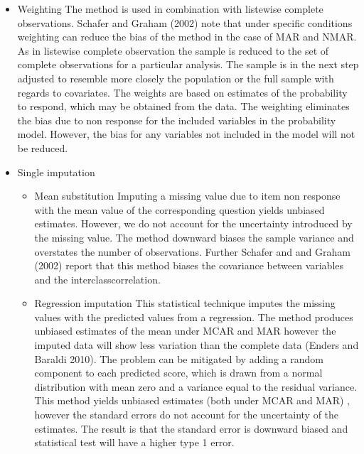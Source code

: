 \begin{itemize}
 \item Weighting
The method is used in combination with listewise complete observations. Schafer and Graham (2002) note that under specific conditions weighting can reduce the bias of the method in the case of MAR and NMAR. As in listewise complete observation the sample is reduced to the set of complete observations for a particular analysis. The sample is in the next step adjusted to resemble more closely the population or the full sample with regards to covariates. The weights are based on estimates of the probability to respond, which may be obtained from the data. The weighting eliminates the bias due to non response for the included variables in the probability model. However, the bias for any variables not included in the model will not be reduced.
\end{itemize}
 \begin{itemize} 
\item Single imputation
\begin{itemize}
\item Mean substitution
Imputing a missing value due to item non response with the mean value of the corresponding question yields unbiased estimates. However, we do not account for the uncertainty introduced by the missing value. The method downward biases the sample variance and  overstates the number of observations. Further Schafer and and Graham (2002) report that this method biases the covariance between variables and the interclasscorrelation. 
\item  Regression imputation
This statistical technique imputes the missing values with the predicted values from a regression. The method produces unbiased estimates of the mean under MCAR and MAR however the imputed data will show less variation than the complete data (Enders and Baraldi 2010). The problem can be mitigated by adding a random component to each predicted score, which is drawn from a normal distribution with mean zero and a variance equal to the residual variance. This method yields unbiased estimates (both under MCAR and MAR) , however the standard errors do not account for the uncertainty of the estimates. The result is that the standard error is downward biased and statistical test will have a higher type 1 error. 
 \end{itemize}  

\end{itemize}  
